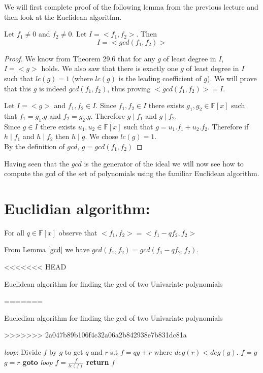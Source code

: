 We will first complete proof of the following lemma from the previous lecture and then look at the Euclidean algorithm.

\begin{lemma}
\label{gcd}
Let $f_1 \neq 0$ and $f_2\neq 0$. Let $I = <f_1, f_2>$. Then
$$I=<gcd(f_1,f_2)>$$
\end{lemma}
\begin{proof}
We know from Theorem 29.6 that for any $g$ of least degree in $I$, $I=<g>$ holds. We also saw that there is exactly one $g$ of least degree in $I$ such that $lc(g)=1$ (where $lc(g)$ is the leading coefficient of $g$). We will prove that this $g$ is indeed $gcd(f_{1},f_{2})$, thus proving $<gcd(f_{1},f_{2})>=I$.

Let $I=<g>$ and $f_{1},f_{2}\in I$. Since $f_{1},f_{2}\in I$ there exists $g_{1},g_{2}\in \mathbb{F}[x]$ such that $f_{1}=g_{1}.g$ and $f_{2}=g_{2}.g$. Therefore $g\mid f_{1}$ and $g\mid f_{2}$. \\

Since $g\in I$ there exists $u_{1},u_{2}\in \mathbb{F}[x]$ such that $g=u_{1}.f_{1}+u_{2}.f_{2}$. Therefore if $h\mid f_{1}$ and 
$h\mid f_{2}$ then $h\mid g$. We chose $lc(g)=1$.\\
By the definition of $gcd$, $g=gcd(f_{1},f_{2})$
\end{proof}

Having seen that the $gcd$ is the generator of the ideal we will now see how to compute the gcd of the set of polynomials using the familiar Euclidean algorithm.


\section*{Euclidian algorithm:}
\begin{observation}
For all $q\in \mathbb{F}[x]$ observe that
$<f_{1},f_{2}>=<f_{1}-qf_{2},f_{2}>$
\end{observation}

From Lemma \ref{gcd} we have $gcd(f_{1},f_{2})=gcd(f_{1}-qf_{2},f_{2})$.


\begin{algorithm}
<<<<<<< HEAD
\caption{Euclidean algorithm for finding the gcd of two Univariate polynomials}
\label{euclid}
=======
\caption{Eucledian algorithm for finding the gcd of two Univariate polynomials}\label{div-euclid}
>>>>>>> 2a047b89b106f4c32a06a2b842938e7b831dc81a
\begin{algorithmic}[1]
\State \emph{loop}:
\State Divide $f$ by $g$ to get $q$ and $r$ s.t $f=qg+r$ where $deg(r)< deg(g)$.
\State $f=g$
\State $g=r$
\State \textbf{goto} \emph{loop}
\EndIf
\State $f=\frac{f}{lc(f)}$
\State \textbf{return} $f$
\EndProcedure
\end{algorithmic}
\end{algorithm}



